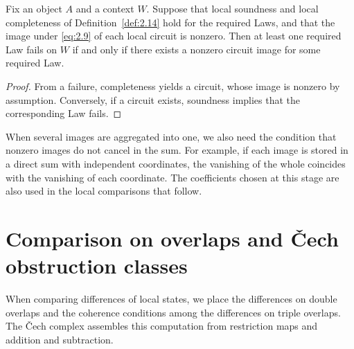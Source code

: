 \begin{proposition}\label{prop:2.15}

Fix an object $A$ and a context $W$. Suppose that local soundness and local completeness
of Definition~\ref{def:2.14} hold for the required Laws, and that the image under
\eqref{eq:2.9} of each local circuit is nonzero. Then at least one required Law fails on
$W$ if and only if there exists a nonzero circuit image for some required Law.

\end{proposition}

\begin{proof}

From a failure, completeness yields a circuit, whose image is nonzero by assumption.
Conversely, if a circuit exists, soundness implies that the corresponding Law fails.

\end{proof}

When several images are aggregated into one, we also need the condition that nonzero
images do not cancel in the sum. For example, if each image is stored in a direct sum with
independent coordinates, the vanishing of the whole coincides with the vanishing of each
coordinate. The coefficients chosen at this stage are also used in the local comparisons
that follow.

\section{Comparison on overlaps and \v{C}ech obstruction classes}\label{sec:2.4}

When comparing differences of local states, we place the differences on double overlaps
and the coherence conditions among the differences on triple overlaps. The \v{C}ech
complex assembles this computation from restriction maps and addition and subtraction.

